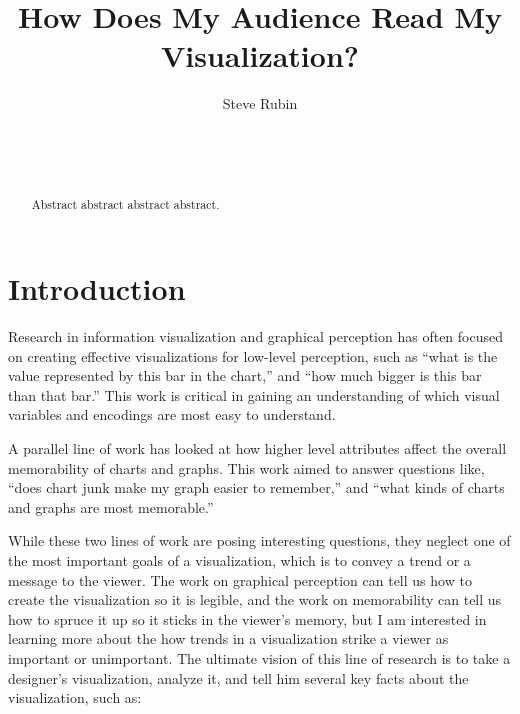 \documentclass{sigchi}
\begin{document}
\title{How Does My Audience Read My Visualization?}

\author{
  \alignauthor Steve Rubin\\
    \\
    \\
    \\
}


\maketitle

\begin{abstract}
Abstract abstract abstract abstract.
\end{abstract}



\section{Introduction}

Research in information visualization and graphical perception has
often focused on creating effective visualizations for low-level
perception, such as ``what is the value represented by this bar in the
chart,'' and ``how much bigger is this bar than that bar.'' This work
is critical in gaining an understanding of which visual variables and
encodings are most easy to understand.

A parallel line of work has looked at how higher level attributes
affect the overall memorability of charts and graphs. This work aimed
to answer questions like, ``does chart junk make my graph easier to
remember,'' and ``what kinds of charts and graphs are most
memorable.''

While these two lines of work are posing interesting questions, they
neglect one of the most important goals of a visualization, which is
to convey a trend or a message to the viewer. The work on graphical
perception can tell us how to create the visualization so it is
legible, and the work on memorability can tell us how to spruce it up
so it sticks in the viewer's memory, but I am interested in learning
more about the how trends in a visualization strike a viewer as
important or unimportant. The ultimate vision of this line of research
is to take a designer's visualization, analyze it, and tell him
several key facts about the visualization, such as:
\end{document}
